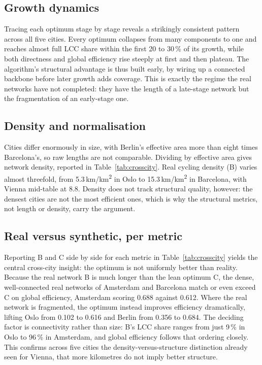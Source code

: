 \documentclass[11pt,a4paper]{article}
\begin{document}
\subsection{Growth dynamics}

Tracing each optimum stage by stage reveals a strikingly consistent pattern across all five
cities. Every optimum collapses from many components to one and reaches almost full LCC
share within the first 20 to 30\,\% of its growth, while both directness and global
efficiency rise steeply at first and then plateau. The algorithm's structural advantage is
thus built early, by wiring up a connected backbone before later growth adds coverage. This
is exactly the regime the real networks have not completed: they have the length of a
late-stage network but the fragmentation of an early-stage one.

\subsection{Density and normalisation}

Cities differ enormously in size, with Berlin's effective area more than eight times
Barcelona's, so raw lengths are not comparable. Dividing by effective area gives network
density, reported in Table~\ref{tab:crosscity}. Real cycling density (B) varies almost
threefold, from 5.3\,km/km\textsuperscript{2} in Oslo to 15.3\,km/km\textsuperscript{2} in
Barcelona, with Vienna mid-table at 8.8. Density does not track structural quality, however:
the densest cities are not the most efficient ones, which is why the structural metrics, not
length or density, carry the argument.

\subsection{Real versus synthetic, per metric}

Reporting B and C side by side for each metric in Table~\ref{tab:crosscity} yields the
central cross-city insight: the optimum is not uniformly better than reality. Because the
real network B is much longer than the lean optimum C, the dense, well-connected real
networks of Amsterdam and Barcelona match or even exceed C on global efficiency, Amsterdam
scoring 0.688 against 0.612. Where the real network is fragmented, the optimum instead
improves efficiency dramatically, lifting Oslo from 0.102 to 0.616 and Berlin from 0.356 to
0.684. The deciding factor is connectivity rather than size: B's LCC share ranges from just
9\,\% in Oslo to 96\,\% in Amsterdam, and global efficiency follows that ordering closely.
This confirms across five cities the density-versus-structure distinction already seen for
Vienna, that more kilometres do not imply better structure.
\end{document}
